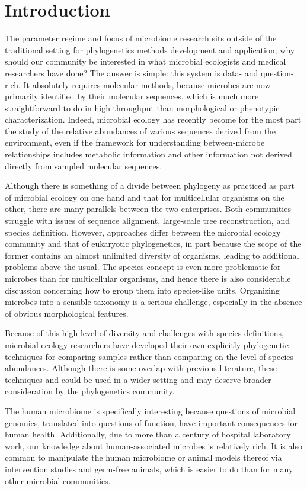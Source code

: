 \documentclass{amsart}
\begin{document}
\section{Introduction}

The parameter regime and focus of microbiome research sits outside of the traditional setting for phylogenetics methods development and application; why should our community be interested in what microbial ecologists and medical researchers have done?
The answer is simple: this system is data- and question-rich.
It absolutely requires molecular methods, because microbes are now primarily identified by their molecular sequences, which is much more straightforward to do in high throughput than morphological or phenotypic characterization.
Indeed, microbial ecology has recently become for the most part the study of the relative abundances of various sequences derived from the environment, even if the framework for understanding between-microbe relationships includes metabolic information and other information not derived directly from sampled molecular sequences.

Although there is something of a divide between phylogeny as practiced as part of microbial ecology on one hand and that for multicellular organisms on the other, there are many parallels between the two enterprises.
Both communities struggle with issues of sequence alignment, large-scale tree reconstruction, and species definition.
However, approaches differ between the microbial ecology community and that of eukaryotic phylogenetics, in part because the scope of the former contains an almost unlimited diversity of organisms, leading to additional problems above the usual.
The species concept is even more problematic for microbes than for multicellular organisms, and hence there is also considerable discussion concerning how to group them into species-like units.
Organizing microbes into a sensible taxonomy is a serious challenge, especially in the absence of obvious morphological features.

Because of this high level of diversity and challenges with species definitions, microbial ecology researchers have developed their own explicitly phylogenetic techniques for comparing samples rather than comparing on the level of species abundances.
Although there is some overlap with previous literature, these techniques and could be used in a wider setting and may deserve broader consideration by the phylogenetics community.

The human microbiome is specifically interesting because questions of microbial genomics, translated into questions of function, have important consequences for human health.
Additionally, due to more than a century of hospital laboratory work, our knowledge about human-associated microbes is relatively rich.
It is also common to manipulate the human microbiome or animal models thereof via intervention studies and germ-free animals, which is easier to do than for many other microbial communities.
\end{document}
